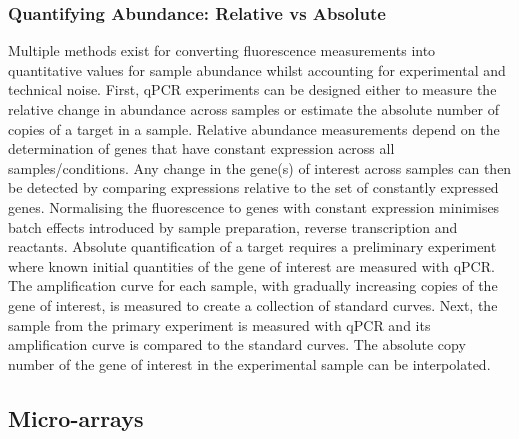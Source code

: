 \documentclass[../main.tex]{subfiles}
\begin{document}
\subsubsection{Quantifying Abundance: Relative vs Absolute}

Multiple methods exist for converting fluorescence measurements into quantitative values for sample abundance whilst accounting for experimental and technical noise. First, qPCR experiments can be designed either to measure the relative change in abundance across samples or estimate the absolute number of copies of a target in a sample. Relative abundance measurements depend on the determination of genes that have constant expression across all samples/conditions. Any change in the gene(s) of interest across samples can then be detected by comparing expressions relative to the set of constantly expressed genes. Normalising the fluorescence to genes with constant expression minimises batch effects introduced by sample preparation, reverse transcription and reactants. Absolute quantification of a target requires a preliminary experiment where known initial quantities of the gene of interest are measured with qPCR. The amplification curve for each sample, with gradually increasing copies of the gene of interest, is measured to create a collection of standard curves. Next, the sample from the primary experiment is measured with qPCR and its amplification curve is compared to the standard curves. The absolute copy number of the gene of interest in the experimental sample can be interpolated.

\subsection{Micro-arrays}
\end{document}
